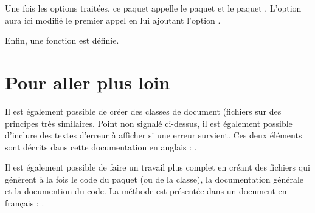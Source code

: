 Une fois les options traitées, ce paquet appelle le paquet  et le paquet . L'option  aura ici modifié le premier appel en lui ajoutant l'option .

Enfin, une fonction  est définie.


\section{Pour aller plus loin}

Il est également possible de créer des classes de document (fichiers  sur des principes très similaires. Point non signalé ci-dessus, il est également possible d'inclure des textes d'erreur à afficher si une erreur survient. Ces deux éléments sont décrits dans cette documentation en anglais : .

Il est également possible de faire un travail plus complet en créant des fichiers qui génèrent à la fois le code du paquet (ou de la classe), la documentation générale et la documention du code. La méthode est présentée dans un document en français : .
